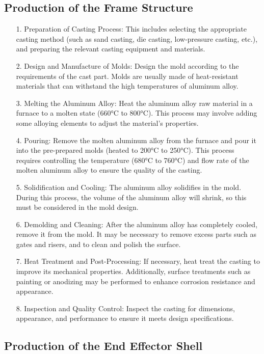 \documentclass[10pt, a4paper, twocolumn]{article}
\begin{document}
\subsection{Production of the Frame Structure}
\begin{itemize}
    \item [1.] Preparation of Casting Process: This includes selecting the appropriate casting method (such as sand casting, die casting, low-pressure casting, etc.), and preparing the relevant casting equipment and materials.
    \item [2.] Design and Manufacture of Molds: Design the mold according to the requirements of the cast part. Molds are usually made of heat-resistant materials that can withstand the high temperatures of aluminum alloy.
    \item [3.] Melting the Aluminum Alloy: Heat the aluminum alloy raw material in a furnace to a molten state (660°C to 800°C). This process may involve adding some alloying elements to adjust the material's properties.
    \item [4.] Pouring: Remove the molten aluminum alloy from the furnace and pour it into the pre-prepared molds (heated to 200°C to 250°C). This process requires controlling the temperature (680°C to 760°C) and flow rate of the molten aluminum alloy to ensure the quality of the casting.
    \item [5.] Solidification and Cooling: The aluminum alloy solidifies in the mold. During this process, the volume of the aluminum alloy will shrink, so this must be considered in the mold design.
    \item [6.] Demolding and Cleaning: After the aluminum alloy has completely cooled, remove it from the mold. It may be necessary to remove excess parts such as gates and risers, and to clean and polish the surface.
    \item [7.] Heat Treatment and Post-Processing: If necessary, heat treat the casting to improve its mechanical properties. Additionally, surface treatments such as painting or anodizing may be performed to enhance corrosion resistance and appearance.
    \item [8.] Inspection and Quality Control: Inspect the casting for dimensions, appearance, and performance to ensure it meets design specifications.
\end{itemize}

\subsection{Production of the End Effector Shell}
\end{document}
